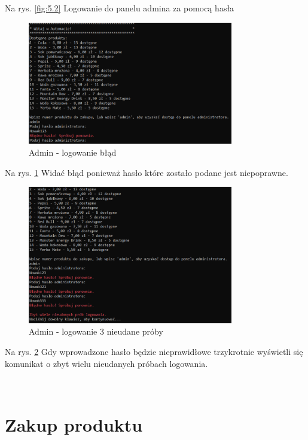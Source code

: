 Na rys. \ref{fig:5.2} Logowanie do panelu admina za pomocą hasła 

\begin{figure}[H] 
    \centering
    \includegraphics[width=0.8\textwidth]{grafiki/blad_admin_haslo1.png}
    \caption{\footnotesize Admin - logowanie błąd}	
    \label{fig:5.3}

\end{figure}

Na rys. \ref{fig:5.3} Widać błąd ponieważ hasło które zostało podane jest niepoprawne.

\newpage

\begin{figure}[H] 
    \centering
    \includegraphics[width=0.8\textwidth]{grafiki/blad_admin_haslo2.png}
    \caption{\footnotesize Admin - logowanie 3 nieudane próby}	
    \label{fig:5.4}

\end{figure}

Na rys. \ref{fig:5.4} Gdy wprowadzone hasło będzie nieprawidłowe trzykrotnie wyświetli się komunikat o zbyt wielu nieudanych próbach logowania.

﻿%

\section{Zakup produktu}

